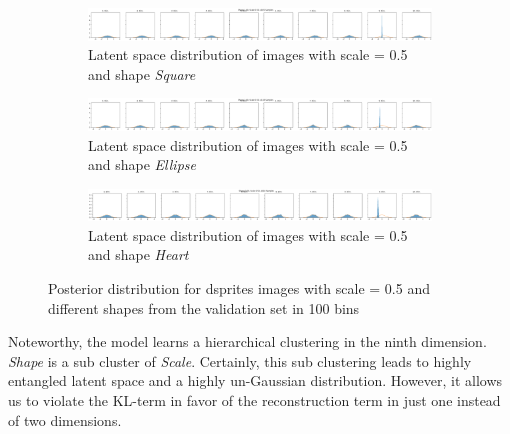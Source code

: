 \begin{figure}
    \centering
    \begin{subfigure}{\textwidth}
        \centering
        \includegraphics[width=\textwidth]{images/latent_space_entanglement/vae_dsprites_lf_10000_dist_shape_1_scale_0_5.png}
        \caption{Latent space distribution of images with scale = 0.5 and shape \textit{Square}}
    \end{subfigure}
    \begin{subfigure}{\textwidth}
        \centering
        \includegraphics[width=\textwidth]{images/latent_space_entanglement/vae_dsprites_lf_10000_dist_shape_2_scale_0_5.png}
        \caption{Latent space distribution of images with scale = 0.5 and shape \textit{Ellipse}}
    \end{subfigure}
    \begin{subfigure}{\textwidth}
        \centering
        \includegraphics[width=\textwidth]{images/latent_space_entanglement/vae_dsprites_lf_10000_dist_shape_3_scale_0_5.png}
        \caption{Latent space distribution of images with scale = 0.5 and shape \textit{Heart}}
    \end{subfigure}
    \caption[VAE Latent Space Distribution - dsprites Scale and Shapes]{Posterior distribution for dsprites images with scale = 0.5 and different shapes from the validation set in 100 bins}
    \label{fig:10000_vae_latent_space_distribution_scales_and_shapes}
\end{figure}

Noteworthy, the model learns a hierarchical clustering in the ninth dimension.
\textit{Shape} is a sub cluster of \textit{Scale}.
Certainly, this sub clustering leads to highly entangled latent space and a highly un-Gaussian distribution.
However, it allows us to violate the \ac{KL}-term in favor of the reconstruction term in just one instead of two dimensions.

